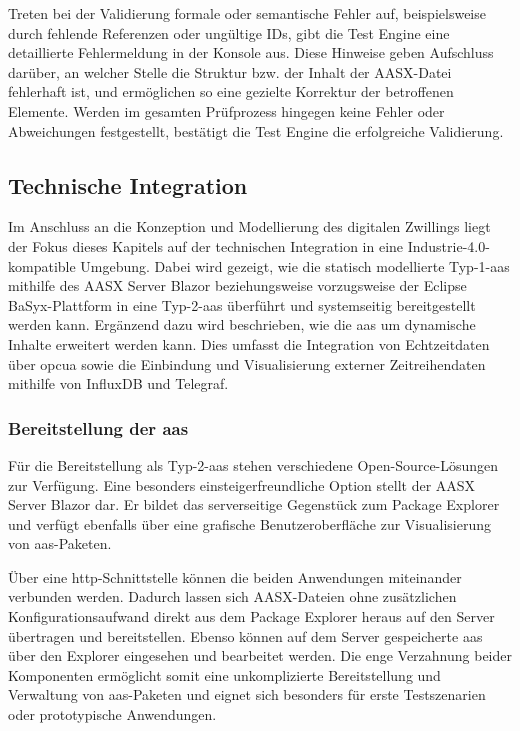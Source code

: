 Treten bei der Validierung formale oder semantische Fehler auf, beispielsweise durch fehlende Referenzen oder ungültige IDs, gibt die Test Engine eine detaillierte Fehlermeldung in der Konsole aus. 
Diese Hinweise geben Aufschluss darüber, an welcher Stelle die Struktur bzw. der Inhalt der AASX-Datei fehlerhaft ist, und ermöglichen so eine gezielte Korrektur der betroffenen Elemente. 
Werden im gesamten Prüfprozess hingegen keine Fehler oder Abweichungen festgestellt, bestätigt die Test Engine die erfolgreiche Validierung.

\subsection{Technische Integration}
Im Anschluss an die Konzeption und Modellierung des digitalen Zwillings liegt der Fokus dieses Kapitels auf der technischen Integration in eine Industrie-4.0-kompatible Umgebung.
Dabei wird gezeigt, wie die statisch modellierte Typ-1-\acs{aas} mithilfe des AASX Server Blazor beziehungsweise vorzugsweise der Eclipse BaSyx-Plattform in eine Typ-2-\acs{aas} überführt und systemseitig bereitgestellt werden kann.
Ergänzend dazu wird beschrieben, wie die \acs{aas} um dynamische Inhalte erweitert werden kann.
Dies umfasst die Integration von Echtzeitdaten über \acs{opcua} sowie die Einbindung und Visualisierung externer Zeitreihendaten mithilfe von InfluxDB und Telegraf.

\subsubsection{Bereitstellung der \acs{aas}}
\label{sec:bereitstellungAAS}
Für die Bereitstellung als Typ-2-\acs{aas} stehen verschiedene Open-Source-Lösungen zur Verfügung. 
Eine besonders einsteigerfreundliche Option stellt der AASX Server Blazor \cite{AASXServer} dar.
Er bildet das serverseitige Gegenstück zum Package Explorer und verfügt ebenfalls über eine grafische Benutzeroberfläche zur Visualisierung von \acs{aas}-Paketen.

Über eine \acs{http}-Schnittstelle können die beiden Anwendungen miteinander verbunden werden.
Dadurch lassen sich AASX-Dateien ohne zusätzlichen Konfigurationsaufwand direkt aus dem Package Explorer heraus auf den Server übertragen und bereitstellen.
Ebenso können auf dem Server gespeicherte \acs{aas} über den Explorer eingesehen und bearbeitet werden.
Die enge Verzahnung beider Komponenten ermöglicht somit eine unkomplizierte Bereitstellung und Verwaltung von \acs{aas}-Paketen und eignet sich besonders für erste Testszenarien oder prototypische Anwendungen.

